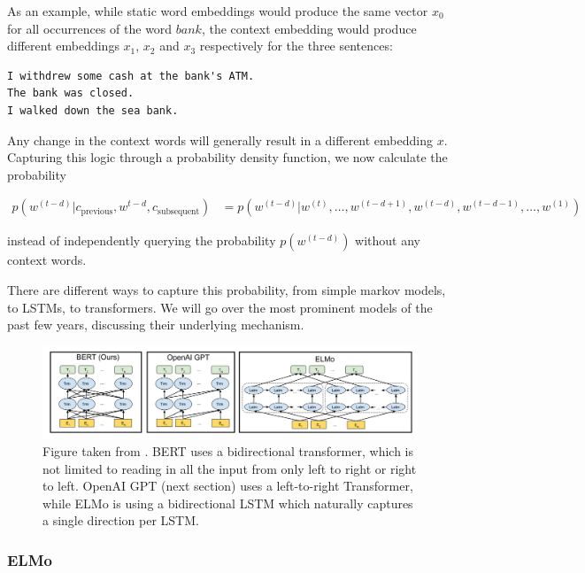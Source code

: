 \documentclass[a4paper,12pt,twoside,openright]{report}
\begin{document}
As an example, while static word embeddings would produce the same vector $x_0$ for all occurrences of the word $bank$, the context embedding would produce different embeddings $x_1$, $x_2$ and $x_3$ respectively for the three sentences:

\begin{tcolorbox}
\begin{verbatim}
I withdrew some cash at the bank's ATM.
The bank was closed.
I walked down the sea bank.
\end{verbatim}
\end{tcolorbox}

Any change in the context words will generally result in a different embedding $x$.
Capturing this logic through a probability density function, we now calculate the probability

\begin{align}
p(w^{(t-d)} | c_\text{previous}, w^{t-d}, c_\text{subsequent}) &= p(w^{(t-d)} | w^{(t)}, \ldots, w^{(t-d + 1)}, w^{(t-d)}, w^{(t-d - 1)}, \ldots, w^{(1)})
\end{align}{\label{eq:transformer_probability}}

instead of independently querying the probability $p(w^{(t-d)})$ without any context words.

There are different ways to capture this probability, from simple markov models, to LSTMs, to transformers.
We will go over the most prominent models of the past few years, discussing their underlying mechanism.

\begin{figure}[h]
	\center
  \includegraphics[width=\linewidth]{./assets/background/BERT_GPT_ELMo.png}
  \caption{Figure taken from \cite{devlin18}. BERT uses a bidirectional transformer, which is not limited to reading in all the input from only left to right or right to left. OpenAI GPT (next section) uses a left-to-right Transformer, while ELMo is using a bidirectional LSTM which naturally captures a single direction per LSTM. }
  \label{fig:attention_is_all_you_need}
\end{figure}

\subsubsection{ELMo}
\end{document}
